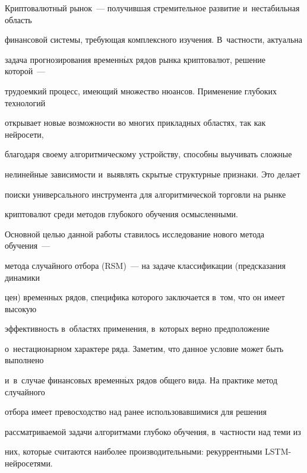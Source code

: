 Криптовалютный рынок~--- получившая стремительное развитие и~нестабильная область 

финансовой системы, требующая комплексного изучения. В~част\-ности, актуальна 

задача прогнозирования временн$\acute{\mbox{ы}}$х рядов рынка криптовалют, решение которой~--- 

трудоемкий процесс, име\-ющий множество нюансов. Применение глубоких технологий 

открывает новые возможности во многих прикладных областях, так как нейросети, 

благодаря своему алгоритмическому устройству, способны выучивать сложные 

нелинейные за\-ви\-си\-мости и~выявлять скрытые структурные признаки. Это делает 

поиски универсального инструмента для алгоритмической торговли на рынке 

криптовалют среди методов глубокого обучения осмысленными.



Основной целью данной работы ставилось исследование нового метода обуче\-ния~--- 

метода случайного отбора (RSM)~--- на задаче классификации (предсказания динамики 

цен) временных рядов, специфика которого заключается в~том, что он имеет высокую 

эффективность в~областях применения, в~которых верно предположение 

о~нестационарном характере ряда. Заметим, что данное условие может быть выполнено 

и~в~случае финансовых временн$\acute{\mbox{ы}}$х рядов общего вида. На практике метод случайного 

отбора имеет превосходство над ранее использовавшимися для решения 

рассматриваемой задачи алгоритмами глубоко обучения, в~част\-ности над теми из 

них, которые считаются наиболее производительными: рекуррентными LSTM-ней\-ро\-се\-тями.







